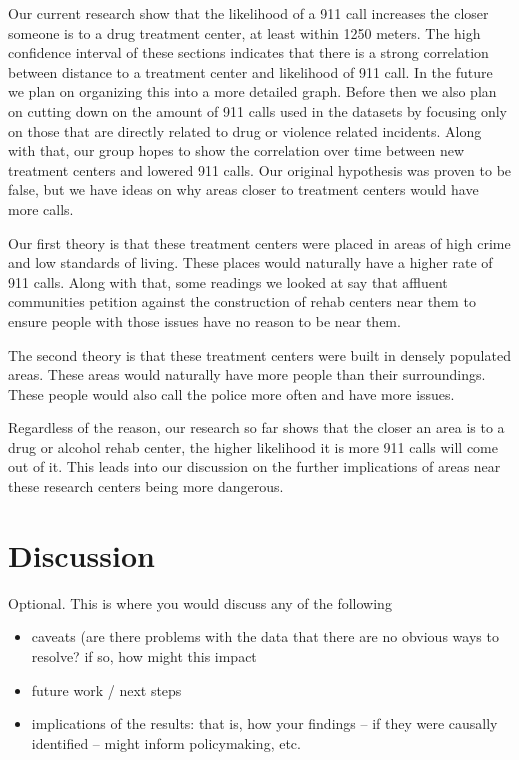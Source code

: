 \documentclass[12pt]{article}
\begin{document}
Our current research show that the likelihood of a 911 call increases the closer someone is to a drug treatment center, at least within 1250 meters. The high confidence interval of these sections indicates that there is a strong correlation between distance to a treatment center and likelihood of 911 call. In the future we plan on organizing this into a more detailed graph. Before then we also plan on cutting down on the amount of 911 calls used in the datasets by focusing only on those that are directly related to drug or violence related incidents. Along with that, our group hopes to show the correlation over time between new treatment centers and lowered 911 calls. Our original hypothesis was proven to be false, but we have ideas on why areas closer to treatment centers would have more calls.

Our first theory is that these treatment centers were placed in areas of high crime and low standards of living. These places would naturally have a higher rate of 911 calls. Along with that, some readings we looked at say that affluent communities petition against the construction of rehab centers near them to ensure people with those issues have no reason to be near them.

The second theory is that these treatment centers were built in densely populated areas. These areas would naturally have more people than their surroundings. These people would also call the police more often and have more issues.

Regardless of the reason, our research so far shows that the closer an area is to a drug or alcohol rehab center, the higher likelihood it is more 911 calls will come out of it. This leads into our discussion on the further implications of areas near these research centers being more dangerous.

\section{Discussion}
\label{sec:discussion}

Optional. This is where you would discuss any of the following
\begin{itemize}
    \item caveats (are there problems with the data that there are no obvious ways to resolve? if so, how might this impact
    \item future work / next steps
    \item     implications of the results: that is, how your findings -- if they were causally identified -- might inform policymaking, etc.
    \end{itemize}
\end{document}
